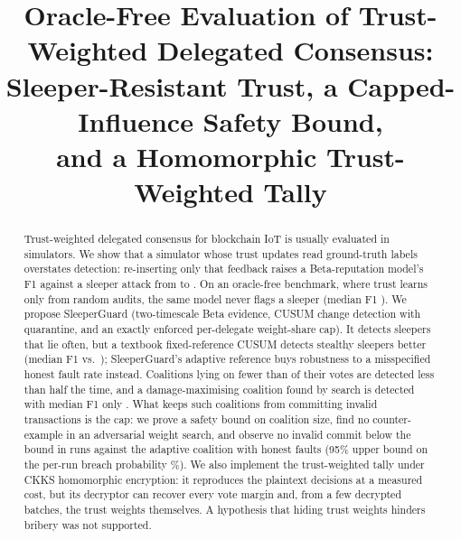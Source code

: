 \documentclass[conference]{IEEEtran}
\begin{document}
\title{Oracle-Free Evaluation of Trust-Weighted Delegated Consensus:\\
Sleeper-Resistant Trust, a Capped-Influence Safety Bound,\\
and a Homomorphic Trust-Weighted Tally}

\author{}

\maketitle

\begin{abstract}
Trust-weighted delegated consensus for blockchain IoT is usually evaluated in simulators. We show that a
simulator whose trust updates read ground-truth labels overstates detection: re-inserting only that feedback
raises a Beta-reputation model's F1 against a sleeper attack from \EzeroHonestTdp{} to \EzeroOracleTdp{}.
On an oracle-free benchmark, where trust learns only from random audits, the same model never flags a sleeper
(median F1 \EoneTdpFive{}). We propose SleeperGuard (two-timescale Beta evidence, CUSUM change detection with
quarantine, and an exactly enforced per-delegate weight-share cap). It detects sleepers that lie often, but a
textbook fixed-reference CUSUM detects stealthy sleepers better (median F1 \EfourteenCuStealthFOne{} vs.\
\EfourteenSgStealthFOne{}); SleeperGuard's adaptive reference buys robustness to a misspecified honest fault rate
instead. Coalitions lying on fewer than \EtwelveHalfRate{} of their votes are
detected less than half the time, and a damage-maximising coalition found by search is detected with median F1 only
\EelevenFOneSgFull{}. What keeps such coalitions from committing invalid transactions is the cap: we prove a safety
bound on coalition size, find no counter-example in an adversarial weight search, and observe no invalid commit below the
bound in \EtenEnvRunsSafeFive{} runs against the adaptive coalition with honest faults (95\% upper bound on the
per-run breach probability \EtenEnvBreachSafeFiveCp{}\%). We also implement the trust-weighted tally under CKKS homomorphic
encryption: it reproduces the plaintext decisions at a measured cost, but its decryptor can recover every
vote margin and, from a few decrypted batches, the trust weights themselves. A hypothesis that hiding trust weights hinders bribery was not supported.
\end{abstract}
\end{document}
